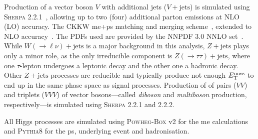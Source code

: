 Production of a vector boson $V$ with additional jets ($V+\mathrm{jets}$) is simulated using \textsc{Sherpa} 2.2.1~\cite{Gleisberg:2008ta,Bothmann:2019yzt}, allowing up to two (four) additional parton emissions at NLO (LO) accuracy. The CKKW \gls{me}+\gls{ps} matching and merging scheme~\cite{Hoeche:2009rj,Catani:2001cc}, extended to NLO accuracy~\cite{Hoeche:2012yf}. The \glspl{PDF} used are provided by the NNPDF 3.0 NNLO set~\cite{Ball:2014uwa}. While $W(\rightarrow\ell\nu)+\mathrm{jets}$ is a major background in this analysis, $Z+\mathrm{jets}$ plays only a minor role, as the only irreducible component is $Z(\rightarrow\tau\tau)+\mathrm{jets}$, where one $\tau$-lepton undergoes a leptonic decay and the other one a hadronic decay. Other $Z+\mathrm{jets}$ processes are reducible and typically produce not enough $E_{\textrm{T}}^{\textrm{miss}}$ to end up in the same phase space as signal processes. Production of of pairs ($VV$) and triplets ($VVV$) of vector bosons---called \textit{diboson} and \textit{multiboson} production, respectively---is simulated using \textsc{Sherpa} 2.2.1 and 2.2.2.

All Higgs processes are simulated using \textsc{Powheg-Box} v2 for the \gls{me} calculations and \textsc{Pythia8} for the \gls{ps}, underlying event and hadronisation. 

